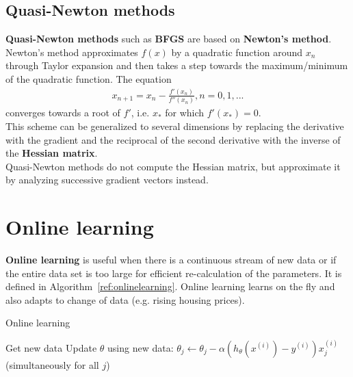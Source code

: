 \documentclass{report}
\begin{document}
\subsection{Quasi-Newton methods}
{\bf Quasi-Newton methods} such as {\bf BFGS} are based on {\bf Newton's method}.
Newton's method approximates $f(x)$ by a quadratic function around $x_n$ through Taylor expansion and then takes a step towards the maximum/minimum of the quadratic function.
The equation
\begin{align*}
x_{n+1} = x_n - \frac{f'(x_n)}{f''(x_n)}, n = 0, 1, ...
\end{align*}
converges towards a root of $f'$, i.e. $x_*$ for which $f'(x_*)=0$. \\
This scheme can be generalized to several dimensions by replacing the derivative with the gradient and the reciprocal of the second derivative with the inverse of the {\bf Hessian matrix}. \\
Quasi-Newton methods do not compute the Hessian matrix, but approximate it by analyzing successive gradient vectors instead.


\section{Online learning}
{\bf Online learning} is useful when there is a continuous stream of new data or if the entire data set is too large for efficient re-calculation of the parameters. It is defined in Algorithm~\ref{ref:onlinelearning}. Online learning learns on the fly and also adapts to change of data (e.g. rising housing prices).

\begin{algorithm}
\caption{Online learning}
\label{ref:onlinelearning}
\begin{algorithmic}
\State Get new data
\Repeat
\State Update $\theta$ using new data: $\theta_j\gets \theta_j - \alpha (h_\theta(x^{(i)})-y^{(i)})x_j^{(i)}$ (simultaneously for all $j$)
\end{algorithmic}
\end{algorithm}
\end{document}
